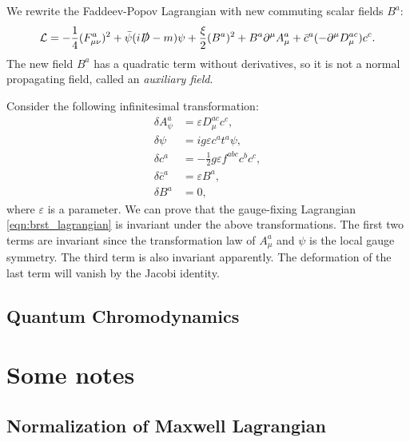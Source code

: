 \documentclass[a4paper,pdftex]{article}
\begin{document}
We rewrite the Faddeev-Popov Lagrangian with new commuting scalar fields $B^{a}$:
\begin{equation}
  \mathcal{L}
  =
  -\frac{1}{4}
  (F_{\mu\nu}^{a})^2
  +
  \bar{\psi}(i\slashed{D}-m)\psi
  +
  \frac{\xi}{2}(B^{a})^2
  +
  B^{a}\partial^{\mu}A_{\mu}^{a}
  +
  \bar{c}^{a}(-\partial^{\mu}D_{\mu}^{ac})c^{c}
  .
  \label{eqn:brst_lagrangian}
\end{equation}
The new field $B^{a}$ has a quadratic term without derivatives, so it is not a normal propagating field, called an \textit{auxiliary field}. 

Consider the following infinitesimal transformation:
\begin{align}
  \delta A_{\psi}^{a}
  &=
  \varepsilon D_{\mu}^{ac}c^{c}
  ,
  \\
  \delta\psi
  &=
  ig\varepsilon c^{a}t^{a}\psi
  ,
  \\
  \delta c^{a}
  &=
  -
  \frac{1}{2}g\varepsilon f^{abc}c^{b}c^{c}
  ,
  \\
  \delta \bar{c}^{a}
  &=
  \varepsilon B^{a}
  ,
  \\
  \delta B^{a}
  &=
  0
  ,
\end{align}
where $\varepsilon$ is a parameter. We can prove that the gauge-fixing Lagrangian \eqref{eqn:brst_lagrangian} is invariant under the above transformations. The first two terms are invariant since the transformation law of $A_{\mu}^{a}$ and $\psi$ is the local gauge symmetry. The third term is also invariant apparently. The deformation of the last term will vanish by the Jacobi identity.









\subsection{Quantum Chromodynamics}








\clearpage
\appendix
\section{Some notes}

\subsection{Normalization of Maxwell Lagrangian}
\end{document}

